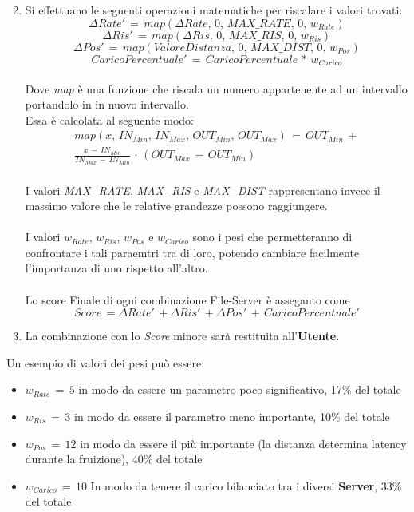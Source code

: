 \documentclass{article}
\begin{document}
\begin{enumerate}
\[    \] 
    \item Si effettuano le seguenti operazioni matematiche per riscalare i valori trovati: \\
    \[
    \Delta Rate'\,=\,map(\Delta Rate,\,0,\,MAX\_RATE,\,0,\,w_{Rate}) 
    \]
    \[
    \Delta Ris'\,=\,map(\Delta Ris,\,0,\,MAX\_RIS,\,0,\,w_{Ris}) 
    \]
    \[
    \Delta Pos'\,=\,map(ValoreDistanza,\,0,\,MAX\_DIST,\,0,\,w_{Pos}) 
    \]
    \[
    CaricoPercentuale'\,=\,CaricoPercentuale\,*\,w_{Carico} 
    \]\\
    Dove \textit{map} è una funzione che riscala un numero appartenente ad un intervallo portandolo in in nuovo intervallo. \\ 
    Essa è calcolata al seguente modo: \\
    \[
    \begin{split}
    map(x,\,IN_{Min},\,IN_{Max},\,OUT_{Min},\,OUT_{Max})\,=\,OUT_{Min}\,+\\
    \frac{x\,-\,IN_{Min}}{IN_{Max}\,-\,IN_{Min}}\,\cdot\,(OUT_{Max}\,-\,OUT_{Min})
    \end{split}
    \] \\
    I valori \textit{MAX\_RATE}, \textit{MAX\_RIS} e \textit{MAX\_DIST} rappresentano invece il massimo valore che le relative grandezze possono raggiungere. \\ \\
    I valori $w_{Rate}$, $w_{Ris}$, $w_{Pos}$ e $w_{Carico}$ sono i pesi che permetteranno di confrontare i tali paraemtri tra di loro, potendo cambiare facilmente l'importanza di uno rispetto all'altro. \\ \\
    Lo score Finale di ogni combinazione File-Server è asseganto come
    \[
    Score\,=\Delta Rate'\,+\Delta Ris'\,+\Delta Pos'\,+\,CaricoPercentuale' 
    \]
    \item La combinazione con lo \textit{Score} minore sarà restituita all'\textbf{Utente}. 
\end{enumerate} 
Un esempio di valori dei pesi può essere:
\begin{itemize}
    \item $w_{Rate}\,=\,5$ in modo da essere un parametro poco significativo, 17\% del totale
    \item $w_{Ris}\,=\,3$ in modo da essere il parametro meno importante, 10\% del totale
    \item $w_{Pos}\,=\,12$ in modo da essere il più importante (la distanza determina latency durante la fruizione), 40\% del totale
    \item $w_{Carico}\,=\,10$ In modo da tenere il carico bilanciato tra i diversi \textbf{Server}, 33\% del totale
\end{itemize}
\end{document}
